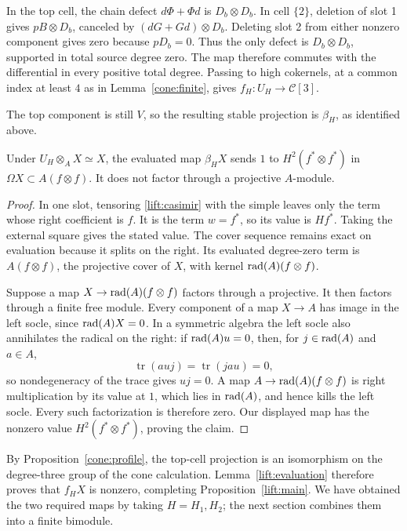 In the top cell, the chain defect $d\Phi+\Phi d$ is
$D_b\otimes D_b$.  In cell $\{2\}$, deletion of slot 1 gives
$pB\otimes D_b$, canceled by
$(dG+Gd)\otimes D_b$.  Deleting slot 2 from either nonzero component
gives zero because $pD_b=0$.  Thus the only defect is
$D_b\otimes D_b$, supported in total source degree zero.
The map therefore commutes with the differential in every positive
total degree.  Passing to high cokernels, at a common index at least $4$ as in
Lemma~\ref{cone:finite}, gives $f_H:U_H\to\mathcal C[3]$.

The top component is still $V$, so the resulting stable projection is
$\beta_H$, as identified above.

\begin{lemma}
\label{lift:evaluation}
Under $U_H\otimes_A X\simeq X$, the evaluated map $\beta_H X$ sends
$1$ to $H^2(f^*\otimes f^*)$ in $\Omega X\subset A(f\otimes f)$.
It does not factor through a projective $A$-module.
\end{lemma}
\begin{proof}
In one slot, tensoring \eqref{lift:casimir} with the simple leaves only
the term whose right coefficient is $f$.  It is the term $w=f^*$, so its
value is $Hf^*$.  Taking the external square gives the stated value.
The cover sequence remains exact on evaluation because it splits on
the right.  Its evaluated degree-zero term is $A(f\otimes f)$, the
projective cover of $X$, with kernel $\operatorname{rad}(A)(f\otimes f)$.

Suppose a map $X\to\operatorname{rad}(A)(f\otimes f)$ factors through a projective.
It then factors through a finite free module.  Every component of a
map $X\to A$ has image in the left socle, since $\operatorname{rad}(A)X=0$.
In a symmetric algebra the left socle also annihilates the radical on
the right: if $\operatorname{rad}(A)u=0$, then, for $j\in\operatorname{rad}(A)$ and $a\in A$,
\[
 \operatorname{tr}(auj)=\operatorname{tr}(jau)=0,
\]
so nondegeneracy of the trace gives $uj=0$.
A map $A\to\operatorname{rad}(A)(f\otimes f)$ is right multiplication by its value
at $1$, which lies in $\operatorname{rad}(A)$, and hence kills the left socle.
Every such factorization is therefore zero.  Our displayed map has
the nonzero value $H^2(f^*\otimes f^*)$, proving the claim.
\end{proof}

By Proposition~\ref{cone:profile}, the top-cell projection is an
isomorphism on the degree-three group of the cone calculation.  Lemma~\ref{lift:evaluation} therefore proves
that $f_HX$ is nonzero, completing Proposition~\ref{lift:main}.
We have obtained the two required maps by taking $H=H_1,H_2$;
the next section combines them into a finite bimodule.
